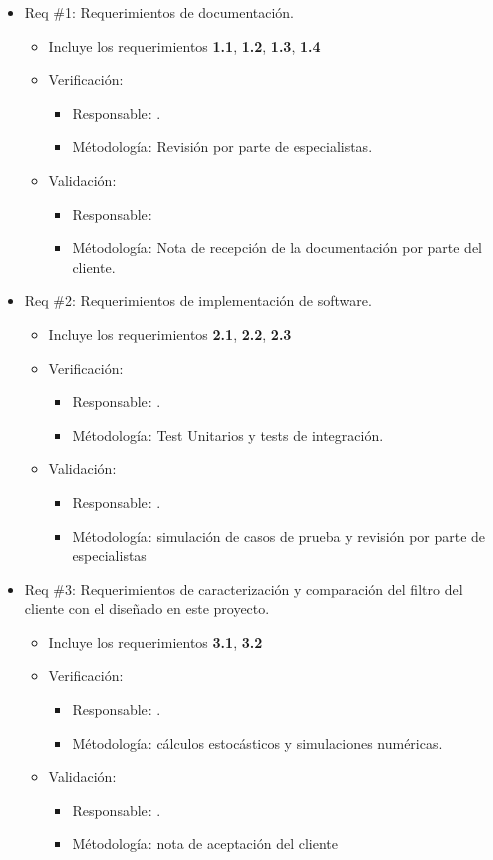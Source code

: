 \documentclass[11pt]{charter}
\begin{document}
\begin{itemize} 
\item Req \#1: Requerimientos de documentación.
	\begin{itemize}
	\item Incluye los requerimientos \textbf{1.1}, \textbf{1.2}, \textbf{1.3}, \textbf{1.4}
	\item Verificación: 
	\begin{itemize}
		\item Responsable: \authorname.
		\item Métodología: Revisión por parte de especialistas. 
	\end{itemize}	 
	\item Validación:
	\begin{itemize}
		\item Responsable: \clientename	
		\item Métodología: Nota de recepción de la documentación por parte del cliente. 	
	\end{itemize}
	\end{itemize}

\item Req \#2: Requerimientos de implementación de software.
	\begin{itemize}
	\item Incluye los requerimientos \textbf{2.1}, \textbf{2.2}, \textbf{2.3}
	\item Verificación: 
	\begin{itemize}
		\item Responsable: \authorname.
		\item Métodología: Test Unitarios y tests de integración.
	\end{itemize}	 
	\item Validación:
	\begin{itemize}
		\item Responsable: \authorname.	
		\item Métodología: simulación de casos de prueba y revisión por parte de especialistas
	\end{itemize}
	\end{itemize}

\item Req \#3: Requerimientos de caracterización y comparación del filtro del cliente con el diseñado en este proyecto.
	\begin{itemize}
	\item Incluye los requerimientos \textbf{3.1}, \textbf{3.2}
	\item Verificación: 
	\begin{itemize}
		\item Responsable: \authorname.
		\item Métodología: cálculos estocásticos y simulaciones numéricas.
	\end{itemize}	 
	\item Validación:
	\begin{itemize}
		\item Responsable: \authorname.	
		\item Métodología: nota de aceptación del cliente
	\end{itemize}
	\end{itemize}
	

\end{itemize}
\end{document}
